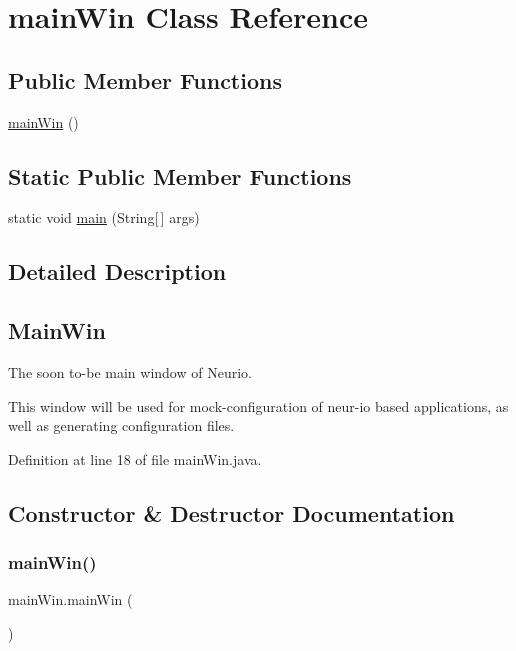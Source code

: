 \hypertarget{classmain_win}{}\section{main\+Win Class Reference}
\label{classmain_win}
\subsection*{Public Member Functions}
\begin{DoxyCompactItemize}
\item 
\hyperlink{classmain_win_a49c22fb02a4187e69d8dd16607446e16}{main\+Win} ()
\end{DoxyCompactItemize}
\subsection*{Static Public Member Functions}
\begin{DoxyCompactItemize}
\item 
static void \hyperlink{classmain_win_a8fcc6dd4f93af4dd5a72a74c461a1fe0}{main} (String\mbox{[}$\,$\mbox{]} args)
\end{DoxyCompactItemize}


\subsection{Detailed Description}
\subsection*{Main\+Win }

The soon to-\/be main window of Neurio.

This window will be used for mock-\/configuration of neur-\/io based applications, as well as generating configuration files. 

Definition at line 18 of file main\+Win.\+java.



\subsection{Constructor \& Destructor Documentation}
\mbox{\label{classmain_win_a49c22fb02a4187e69d8dd16607446e16}} 
\subsubsection{\texorpdfstring{main\+Win()}{mainWin()}}
{\footnotesize\ttfamily main\+Win.\+main\+Win (\begin{DoxyParamCaption}{ }\end{DoxyParamCaption})}


